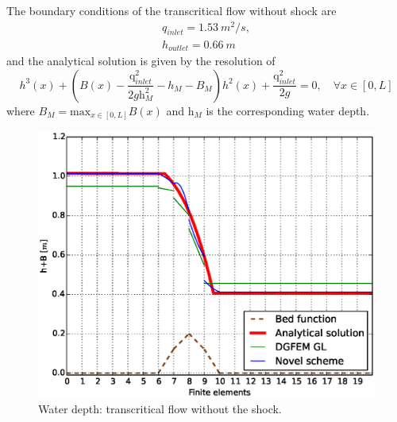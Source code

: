 The boundary conditions of the transcritical flow without shock are 
\begin{equation}
\begin{array}{c}
q_{inlet}=1.53 \ m^2/s,\\
h_{outlet}=0.66 \ m
\end{array}
\end{equation}
and the analytical solution is given by the resolution of
\begin{equation}
h^3(x)+\left( B(x)-\frac{\text{q} _{inlet}^2}{2g \text{h}_M^2}-h_M-B_M \right) h^2(x)+\frac{\text{q} ^2_{inlet}}{2 g}=0, \quad \forall x \in [0,L]
\end{equation}
where $B_M=\text{max}_{x\in [0,L]}B(x)$ and $\text{h}_M$ is the corresponding water depth.
				\begin{figure}[!ht]
								\centering
								 \begin{minipage}[t]{0.44\textwidth}
								    \begin{center}
								    \includegraphics[width=1.0\textwidth]{OBR/bump/transH.eps}
								    \caption{Water depth: transcritical flow without the shock.}
								    \label{transH}
								    \end{center}
								\end{minipage}\hspace{15mm}
								\begin{minipage}[t]{0.44\textwidth}
								    \begin{center}

\end{center}
\end{minipage}
\end{figure}
